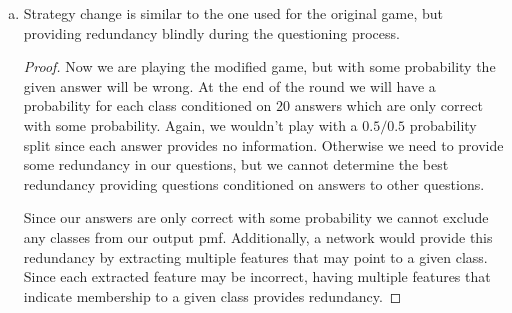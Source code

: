 \documentclass[11pt]{article}
\begin{document}
\begin{enumerate}[(a)]
\begin{proof}
		Otherwise, we can attempt to provide some redundancy in our questions
		to help minimize the uncertainty about answers. We can tailor the
		amount of overlap based on the probability of receiving a correct or
		incorrect answer, with greater overlap required as the probabilities
		approach $0.5 / 0.5$. Furthermore, we can trivially handle the case
		where we are more likely to receive an incorrect answer by negating the
		given answer.
		\newline

		The chain rule can be written as

		\begin{align}
			p\Big( x_{n-1} \vert \hat x_{n-2}, \hat x_{n-3}, \dots,
				\hat x_{0}\Big)
			&= \frac{
			p\Big( x_{n-1}, \hat x_{n-2}, \hat x_{n-3}, \dots,
				\hat x_{0}\Big)
			}{
			p\Big(\hat x_{n-2}, \hat x_{n-3}, \dots,
				\hat x_{0}\Big)
			}
		\end{align}

		Tweaking the overlap of questions would exert control over the joint
		probability seen in the denominator (and partially in numerator).

	\end{proof}

\item
	\begin{solution}
		Strategy change is similar to the one used for the original game, but
		providing redundancy blindly during the questioning process.
	\end{solution}
	\begin{proof}
		Now we are playing the modified game, but with some probability the
		given answer will be wrong. At the end of the round we will have a
		probability for each class conditioned on $20$ answers which are only
		correct with some probability. Again, we wouldn't play with a $0.5 /
		0.5$ probability split since each answer provides no information.
		Otherwise we need to provide some redundancy in our questions, but we
		cannot determine the best redundancy providing questions conditioned on
		answers to other questions.
		\newline

		Since our answers are only correct with some probability we cannot
		exclude any classes from our output pmf. Additionally, a network would
		provide this redundancy by extracting multiple features that may point
		to a given class. Since each extracted feature may be incorrect, having
		multiple features that indicate membership to a given class provides
		redundancy.

	\end{proof}

\end{enumerate}
\end{document}
